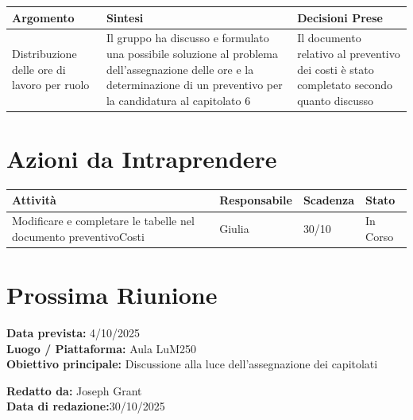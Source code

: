 \documentclass[a4paper,12pt]{article}
\begin{document}
\begin{longtable}{|p{}|p{}|p{}|}
\hline
\textbf{Argomento} & \textbf{Sintesi} & \textbf{Decisioni Prese} \\ \hline
 Distribuzione delle ore di lavoro per ruolo&Il gruppo ha discusso e formulato una possibile soluzione al problema dell'assegnazione delle ore e la determinazione di un preventivo per la candidatura al capitolato 6  & Il documento relativo al preventivo dei costi è stato completato secondo quanto discusso   \\ \hline
 
\end{longtable}


\section*{ Azioni da Intraprendere}

\begin{longtable}{|p{}|p{}|p{}|p{}|}
\hline
\textbf{Attività} & \textbf{Responsabile} & \textbf{Scadenza} & \textbf{Stato} \\ \hline
Modificare e completare le tabelle nel documento preventivoCosti&Giulia  &30/10  &In Corso  \\ \hline
\end{longtable}


\section*{ Prossima Riunione}
\textbf{Data prevista:} 4/10/2025 \\
\textbf{Luogo / Piattaforma:} Aula LuM250 \\
\textbf{Obiettivo principale:} Discussione alla luce dell'assegnazione dei capitolati


\textbf{Redatto da:} Joseph Grant \\
\textbf{Data di redazione:}30/10/2025
\end{document}
